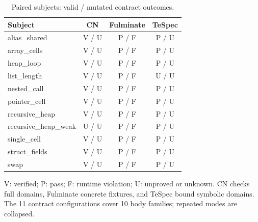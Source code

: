 \begin{table}[t]
\centering\small
\caption{Paired subjects: valid / mutated contract outcomes.}
\label{tab:paired}
\begin{tabular}{lccc}
\toprule
Subject & CN & Fulminate & TeSpec \\
\midrule
alias\_shared & V / U & P / F & P / U \\
array\_cells & V / U & P / F & P / U \\
heap\_loop & V / U & P / F & P / U \\
list\_length & V / U & P / F & U / U \\
nested\_call & V / U & P / F & P / U \\
pointer\_cell & V / U & P / F & P / U \\
recursive\_heap & V / U & P / F & P / U \\
recursive\_heap\_weak & U / U & P / F & P / U \\
single\_cell & V / U & P / F & P / U \\
struct\_fields & V / U & P / F & P / U \\
swap & V / U & P / F & P / U \\
\bottomrule
\end{tabular}
\par\smallskip\parbox{\columnwidth}{\footnotesize V: verified; P: pass; F: runtime violation; U: unproved or unknown. CN checks full domains, Fulminate concrete fixtures, and TeSpec bound symbolic domains. The 11 contract configurations cover 10 body families; repeated modes are collapsed.}
\end{table}
